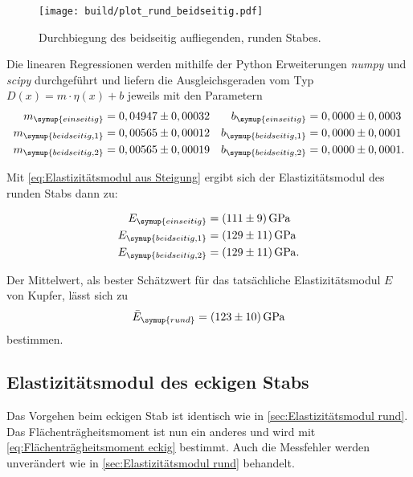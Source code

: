 \begin{figure} [H]
  \centering
  \texttt{[image: build/plot\_rund\_beidseitig.pdf]}
  \caption{Durchbiegung des beidseitig aufliegenden, runden Stabes.}
  \label{fig:rund_beidseitig}
\end{figure}

Die linearen Regressionen werden mithilfe der Python Erweiterungen \textit{numpy}\cite{numpy} und \textit{scipy}\cite{scipy} 
durchgeführt und liefern die Ausgleichsgeraden vom Typ $D(x)=m\cdot\eta(x) + b$ jeweils mit den Parametern
\begin{align}
  m_{\symup{einseitig}} &= 0,04947\pm0,00032 & b_{\symup{einseitig}} &= 0,0000\pm0,0003 \notag \\
  m_{\symup{beidseitig,1}} &= 0,00565\pm0,00012 & b_{\symup{beidseitig,1}} &= 0,0000\pm0,0001 \notag \\
  m_{\symup{beidseitig,2}} &= 0,00565\pm0,00019 & b_{\symup{beidseitig,2}} &= 0,0000\pm0,0001. \notag
\end{align}


Mit \autoref{eq:Elastizitätsmodul aus Steigung} ergibt sich der Elastizitätsmodul des runden Stabs dann zu:

\begin{align}
  E_{\symup{einseitig}}&=\qty{111+-9}{\giga\pascal} \notag \\
  E_{\symup{beidseitig,1}}&=\qty{129+-11}{\giga\pascal} \notag \\
  E_{\symup{beidseitig,2}}&=\qty{129+-11}{\giga\pascal}. \notag
\end{align}

Der Mittelwert, als bester Schätzwert für das tatsächliche Elastizitätsmodul $E$ von Kupfer, lässt sich zu
\begin{equation}
  \bar{E}_{\symup{rund}} = \qty{123+-10}{\giga\pascal} \notag
\end{equation}
bestimmen.

\subsection{Elastizitätsmodul des eckigen Stabs}  %
\label{sec:Elastizitätsmodul eckig}

Das Vorgehen beim eckigen Stab ist identisch wie in \autoref{sec:Elastizitätsmodul rund}.
Das Flächenträgheitsmoment ist nun ein anderes und wird mit \autoref{eq:Flächenträgheitsmoment eckig} bestimmt.
Auch die Messfehler werden unverändert wie in \autoref{sec:Elastizitätsmodul rund} behandelt.

